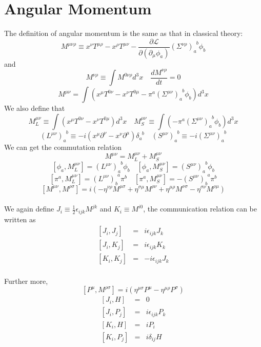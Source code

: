 \documentclass[cyan]{elegantnote}
\begin{document}
\section{Angular Momentum}
\noindent
The definition of angular momentum is the same as that in classical theory:
\[M^{\mu \nu \rho} \equiv x^{\nu}T^{\mu \rho} - x^{\rho} T^{\mu \nu} - \frac{\partial \mathcal{L}}{\partial (\partial_{\mu}\phi_a)}(\Sigma^{\nu \rho})_{a}^{\phantom{a}b}\phi_b\]
and 
\[M^{\nu \rho} \equiv \int M^{0 \nu \rho} d^3 x \quad \frac{dM^{\nu \rho}}{dt} = 0\]
\[M^{\mu \nu} = \int (x^{\mu}T^{0\nu}-x^{\nu}T^{0\mu}-\pi^a(\Sigma^{\mu \nu})_{a}^{\phantom{a}b}\phi_b) d^3 x\]
We also define that
\[M_{L}^{\mu \nu} \equiv \int (x^{\mu}T^{0\nu}-x^{\nu}T^{0\mu}) d^3 x \quad M_S^{\mu \nu} \equiv\int (-\pi^a(\Sigma^{\mu \nu})_{a}^{\phantom{a}b}\phi_b) d^3 x\]
\[(L^{\mu \nu})_a^{\phantom{a}b} \equiv -i(x^{\mu}\partial^{\nu}-x^{\nu}\partial^{\mu})\delta_a^{\phantom{a}b} \quad (S^{\mu \nu})_a^{\phantom{a}b} \equiv -i(\Sigma^{\mu \nu})_a^{\phantom{a}b}\]
We can get the commutation relation
\[M^{\mu \nu} = M_L^{\mu \nu} + M_S^{\mu \nu}\]
\[[\phi_a,M_L^{\mu \nu}] = (L^{\mu \nu})_a^{\phantom{a}b} \phi_b \quad [\phi_a,M_S^{\mu \nu}] = (S^{\mu \nu})_a^{\phantom{a}b} \phi_b\]
\[[\pi^a,M_L^{\mu \nu}] = (L^{\mu \nu})_b^{\phantom{b}a}\pi^{b}  \quad [\pi^a,M_S^{\mu \nu}] = - (S^{\mu \nu})_b^{\phantom{b}a} \pi^b \]
\[[M^{\mu \nu},M^{\rho \sigma}] = i(-\eta^{\nu \rho}M^{\mu \sigma} + \eta^{\sigma \mu}M^{\rho \nu} + \eta^{\mu \rho}M^{\nu \sigma} - \eta^{\sigma \nu}M^{\rho \mu})\] \\
We again define $J_i \equiv \frac{1}{2} \epsilon_{ijk} M^{jk}$ and $K_i \equiv M^{i0}$, the communication relation can be written as
\begin{eqnarray}
\left[J_i,J_j\right] &=& i\epsilon_{ijk}J_k \nonumber \\
\left[J_i,K_j\right] &=& i\epsilon_{ijk}K_k \nonumber \\
\left[K_i,K_j\right] &=& -i\epsilon_{ijk}J_k \nonumber
\end{eqnarray} \\
Further more,
\[[P^{\mu},M^{\rho \sigma}] = i(\eta^{\mu \sigma}P^{\mu} - \eta^{\mu \rho}P^{\sigma})\]
\begin{eqnarray}
\left[J_i,H\right] &=& 0 \nonumber \\
\left[J_i,P_j\right] &=& i\epsilon_{ijk}P_k \nonumber \\
\left[K_i,H\right] &=& iP_i \nonumber \\
\left[K_i,P_j\right] &=& i\delta_{ij}H \nonumber
\end{eqnarray}
\end{document}
